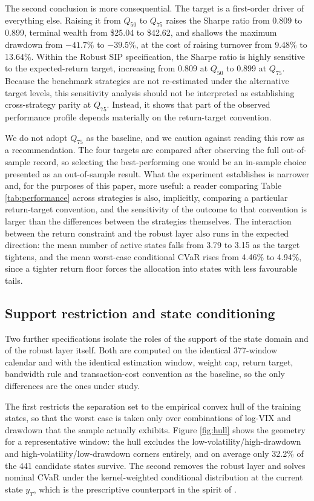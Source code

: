 \documentclass[smallcondensed]{svjour3}
\begin{document}
The second conclusion is more consequential. The target is a first-order driver of everything else. Raising it from $Q_{50}$ to $Q_{75}$ raises the Sharpe ratio from 0.809 to 0.899, terminal wealth from \$25.04 to \$42.62, and shallows the maximum drawdown from $-41.7\%$ to $-39.5\%$, at the cost of raising turnover from 9.48\% to 13.64\%. Within the Robust SIP specification, the Sharpe ratio is highly sensitive to the expected-return target, increasing from 0.809 at $Q_{50}$ to 0.899 at $Q_{75}$. Because the benchmark strategies are not re-estimated under the alternative target levels, this sensitivity analysis should not be interpreted as establishing cross-strategy parity at $Q_{75}$. Instead, it shows that part of the observed performance profile depends materially on the return-target convention.

We do not adopt $Q_{75}$ as the baseline, and we caution against reading this row as a recommendation. The four targets are compared after observing the full out-of-sample record, so selecting the best-performing one would be an in-sample choice presented as an out-of-sample result. What the experiment establishes is narrower and, for the purposes of this paper, more useful: a reader comparing Table \ref{tab:performance} across strategies is also, implicitly, comparing a particular return-target convention, and the sensitivity of the outcome to that convention is larger than the differences between the strategies themselves. The interaction between the return constraint and the robust layer also runs in the expected direction: the mean number of active states falls from 3.79 to 3.15 as the target tightens, and the mean worst-case conditional CVaR rises from 4.46\% to 4.94\%, since a tighter return floor forces the allocation into states with less favourable tails.

\subsection{Support restriction and state conditioning}
\label{sec:referee_benchmarks}
Two further specifications isolate the roles of the support of the state domain
and of the robust layer itself. Both are computed on the identical 377-window
calendar and with the identical estimation window, weight cap, return target,
bandwidth rule and transaction-cost convention as the baseline, so the only
differences are the ones under study.

The first restricts the separation set to the empirical convex hull of the
training states, so that the worst case is taken only over combinations of
log-VIX and drawdown that the sample actually exhibits. Figure
\ref{fig:hull} shows the geometry for a representative window: the hull excludes
the low-volatility/high-drawdown and high-volatility/low-drawdown corners
entirely, and on average only 32.2\% of the 441 candidate states survive. The
second removes the robust layer and solves nominal CVaR under the
kernel-weighted conditional distribution at the current state $y_T$, which is
the prescriptive counterpart in the spirit of \citet{bertsimas2020predictive}.
\end{document}
